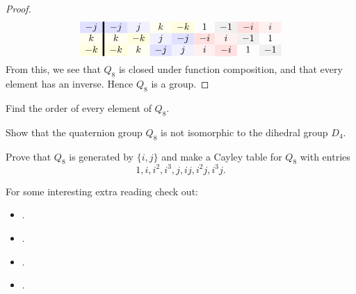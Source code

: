 \documentclass{ximera}
\begin{document}
\begin{example}
\begin{proof}
\begin{gather*}
\begin{array}{c!{\vline width 2pt}cccccccc}
      -j \cellcolor{blue!12!white}& -j \cellcolor{blue!12!white} & j \cellcolor{blue!6!white} & k \cellcolor{yellow!6!white}  & -k\cellcolor{yellow!12!white} & 1  & -1 \cellcolor{black!6!white} & -i \cellcolor{red!12!white} & i \cellcolor{red!6!white} \\
      k \cellcolor{yellow!6!white}& k \cellcolor{yellow!6!white} & -k \cellcolor{yellow!12!white} & j \cellcolor{blue!6!white}  & -j\cellcolor{blue!12!white} & -i \cellcolor{red!12!white} & i\cellcolor{red!6!white}  & -1 \cellcolor{black!6!white} & 1  \\
      -k \cellcolor{yellow!12!white}& -k \cellcolor{yellow!12!white} & k \cellcolor{yellow!6!white} & -j \cellcolor{blue!12!white}  & j\cellcolor{blue!6!white} & i \cellcolor{red!6!white} & -i\cellcolor{red!12!white}  & 1 & -1 \cellcolor{black!6!white}
    \end{array}
    \end{gather*}
    From this, we see that $Q_8$ is closed under function composition,
    and that every element has an inverse. Hence $Q_8$ is a group.
  \end{proof}
\end{example}

\begin{exercise}
  Find the order of every element of $Q_8$.
\end{exercise}


\begin{exercise}
   Show that the quaternion group $Q_8$ is not isomorphic to the
   dihedral group $D_4$.
\end{exercise}

\begin{exercise}
  Prove that $Q_8$ is generated by $\{i, j\}$ and make a Cayley table
  for $Q_8$ with entries
  \[
  1, i, i^2, i^3, j, ij, i^2j, i^3j.
  \]
\end{exercise}


For some interesting extra reading check out:
\begin{itemize}
\item {}.
\item {}.%
\item {}.
\item {}.
\end{itemize}
\end{document}
